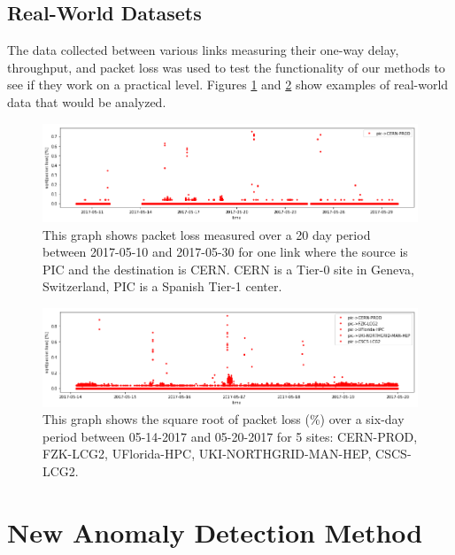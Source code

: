 \documentclass[5p]{elsarticle}
\begin{document}
\subsection{Real-World Datasets}

The data collected between various links measuring their one-way delay, throughput, and packet loss was used to test the functionality of our methods to see if they work on a practical level. Figures \ref{fig:real_one} and \ref{fig:real_five} show examples of real-world data that would be analyzed.
\begin{figure}[htbp]
    \centering
    \includegraphics[width=\linewidth]{real_data_one_link.png}
    \caption{This graph shows packet loss measured over a 20 day period between 2017-05-10 and 2017-05-30 for one link where the source is PIC and the destination is CERN. CERN is a Tier-0 site in Geneva, Switzerland, PIC is a Spanish Tier-1 center.}
    \label{fig:real_one}
\end{figure}
\begin{figure}[htbp]
    \centering
    \includegraphics[width=\linewidth]{real_data_5_links.png}
    \caption{This graph shows the square root of packet loss (\%)  over a six-day period between 05-14-2017 and 05-20-2017 for 5 sites: CERN-PROD, FZK-LCG2, UFlorida-HPC, UKI-NORTHGRID-MAN-HEP, CSCS-LCG2.}
    \label{fig:real_five}
\end{figure}

\section{New Anomaly Detection Method}
\end{document}
